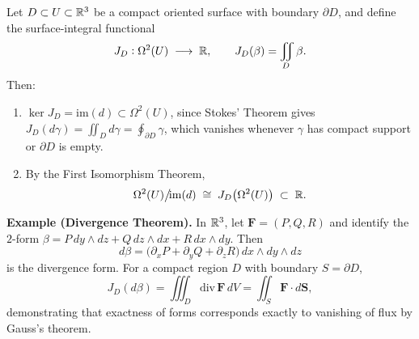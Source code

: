 \documentclass[11pt,openany]{article}
\begin{document}
\begin{proposition}
	Let \(D\subset U\subset\mathbb{R}^3\) be a compact oriented surface with boundary \(\partial D\), and define the surface‐integral functional
	\[
	J_D:\Omega^2(U)\;\longrightarrow\;\mathbb{R},
	\qquad
	J_D(\beta)=\iint_{D}\beta.
	\]
	Then:
	\begin{enumerate}
		\item \(\ker J_D=\mathrm{im}(d)\subset\Omega^2(U)\), since Stokes’ Theorem gives
		\(\displaystyle J_D(d\gamma)=\iint_D d\gamma = \oint_{\partial D}\gamma\), which vanishes whenever \(\gamma\) has compact support or \(\partial D\) is empty.
		\item By the First Isomorphism Theorem,
		\[
		\Omega^2(U)\big/\!\mathrm{im}(d)
		\;\cong\;
		J_D\bigl(\Omega^2(U)\bigr)
		\;\subset\;\mathbb{R}.
		\]
	\end{enumerate}
	
	\medskip
	
	\noindent\textbf{Example (Divergence Theorem).}
	In \(\mathbb{R}^3\), let \(\mathbf F=(P,Q,R)\) and identify the \(2\)-form
	\(\beta = P\,dy\wedge dz + Q\,dz\wedge dx + R\,dx\wedge dy\).  Then
	\[
	d\beta = \bigl(\partial_x P + \partial_y Q + \partial_z R\bigr)\,dx\wedge dy\wedge dz
	\]
	is the divergence form.  For a compact region \(D\) with boundary \(S=\partial D\),
	\[
	J_D(d\beta)
	=\iiint_D \mathrm{div}\,\mathbf F\,dV
	=\iint_S \mathbf F\cdot d\mathbf S,
	\]
	demonstrating that exactness of forms corresponds exactly to vanishing of flux by Gauss’s theorem.
	
\end{proposition}
\end{document}

